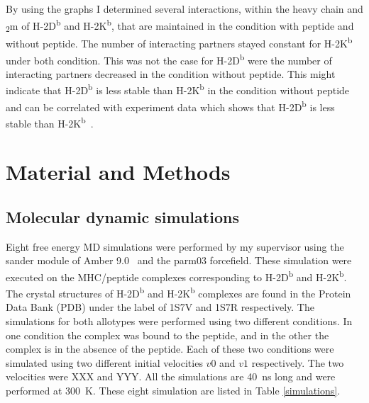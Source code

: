 \documentclass[11pt,twocolumn]{article}
\newcommand{\db}{H-2D\textsuperscript{b}\xspace}
\newcommand{\kb}{H-2K\textsuperscript{b}\xspace}
\newcommand{\btm}{\textbeta\textsubscript{2}m\xspace}
\begin{document}
By using the graphs I determined several interactions, within the heavy chain and \btm of \db and \kb, that are maintained in the condition with peptide and  without peptide. The number of interacting partners stayed constant for \kb under both condition. This was not the case for \db were the number of interacting partners decreased in the condition without peptide. This might indicate that \db is less stable than \kb in the condition without peptide and can be correlated with experiment data which shows that \db is less stable than \kb~\cite{Shields1999561}.

\section*{Material and Methods}

\subsection*{Molecular dynamic simulations}

Eight free energy MD simulations were  performed by my supervisor using the sander module of Amber 9.0~\cite{case2005amber} and the parm03 forcefield.
These simulation were executed on the  MHC/peptide complexes corresponding to  \db and  \kb. 
The crystal structures of \db and  \kb complexes are found in the Protein Data Bank (PDB) under the label of 1S7V and  1S7R respectively. 
The simulations for both allotypes were performed using two different conditions. 
In one condition the complex was bound to the peptide, and in the other  the complex is in the absence of the peptide. 
Each of these two conditions were simulated using two different initial velocities $v0$ and $v1$ respectively. The two velocities were XXX and YYY. 
All the simulations are \SI{40}{\nano\second} long and were performed  at \SI{300}{\kelvin}. These eight simulation are listed in Table \ref{simulations}.
\end{document}
